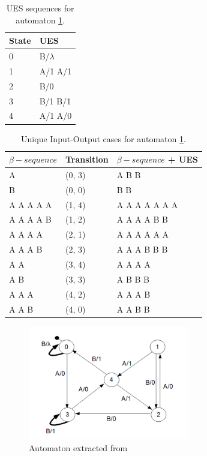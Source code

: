 \begin{table}
\begin{center}
\begin{tabular}{| l | l|}

\hline

State & UES \\ \hline

0 & B/$\lambda$\\ \hline
1 & A/1 A/1\\ \hline
2 & B/0\\ \hline
3 & B/1 B/1\\ \hline
4 & A/1 A/0\\

\hline
\end{tabular}
\end{center}
\caption{UES sequences for automaton \ref{fig:automatonDS_UIO}.\cite{inpe10}}
\label{tableUES_1}
\end{table}

\begin{table}
\begin{center}
\begin{tabular}{| l | l| l|}

\hline

$\beta-sequence$ & Transition & $\beta-sequence$ + UES \\ \hline

A & (0, 3) & A B B\\ \hline
B & (0, 0) & B B\\ \hline
A A A A A & (1, 4) & A A A A A A A\\ \hline
A A A A B & (1, 2) & A A A A B B \\ \hline
A A A A & (2, 1) & A A A A A A\\ \hline
A A A B & (2, 3) & A A A B B B\\ \hline
A A & (3, 4) & A A A A\\ \hline
A B & (3, 3) & A B B B\\ \hline
A A A & (4, 2) & A A A B \\ \hline
A A B & (4, 0) & A A B B \\
\hline
\end{tabular}
\end{center}
\caption{Unique Input-Output cases for automaton \ref{fig:automatonDS_UIO}.\cite{inpe10}}
\label{tableDS}
\end{table}

\begin{figure}[htb]
\centering
\includegraphics[width=7cm]{figuras/automatonDS_UIO}
\caption{\label{fig:automatonDS_UIO} Automaton extracted from \cite{inpe10}}
\end{figure}

